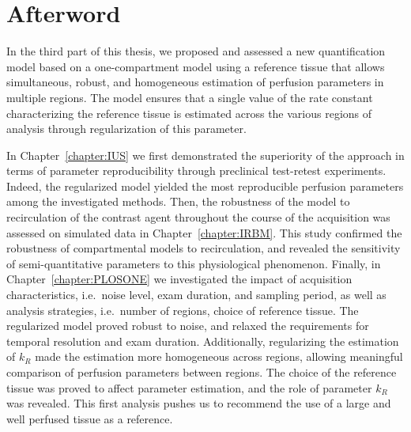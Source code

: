 \chapter*{Afterword}
In the third part of this thesis, we proposed and assessed a new quantification model based on a one-compartment model using a reference tissue that allows simultaneous, robust, and homogeneous estimation of perfusion parameters in multiple regions.
The model ensures that a single value of the rate constant characterizing the reference tissue is estimated across the various regions of analysis through regularization of this parameter.

In Chapter~\ref{chapter:IUS} we first demonstrated the superiority of the approach in terms of parameter reproducibility through preclinical test-retest experiments.
Indeed, the regularized model yielded the most reproducible perfusion parameters among the investigated methods.
Then, the robustness of the model to recirculation of the contrast agent throughout the course of the acquisition was assessed on simulated data in Chapter~\ref{chapter:IRBM}.
This study confirmed the robustness of compartmental models to recirculation, and revealed the sensitivity of semi-quantitative parameters to this physiological phenomenon.
Finally, in Chapter~\ref{chapter:PLOSONE} we investigated the impact of acquisition characteristics, i.e.~noise level, exam duration, and sampling period, as well as analysis strategies, i.e.~number of regions, choice of reference tissue.
The regularized model proved robust to noise, and relaxed the requirements for temporal resolution and exam duration.
Additionally, regularizing the estimation of $k_R$ made the estimation more homogeneous across regions, allowing meaningful comparison of perfusion parameters between regions.
The choice of the reference tissue was proved to affect parameter estimation, and the role of parameter $k_R$ was revealed.
This first analysis pushes us to recommend the use of a large and well perfused tissue as a reference.
